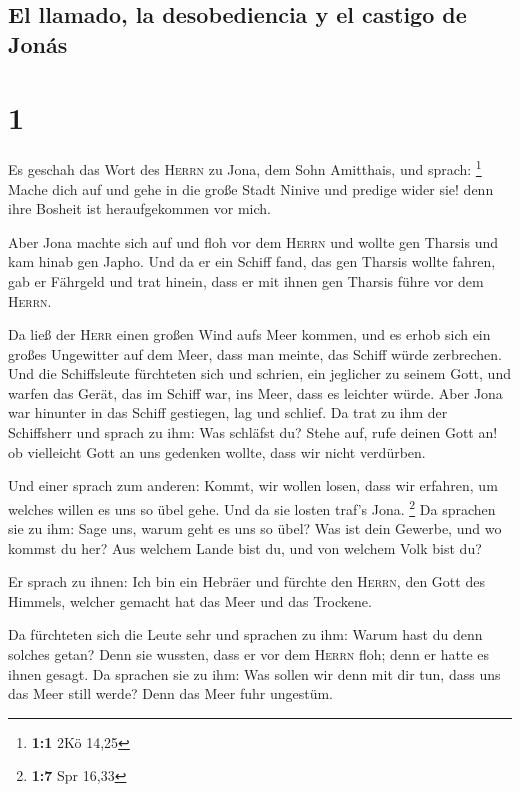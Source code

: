 \hypertarget{el-llamado-la-desobediencia-y-el-castigo-de-jonuxe1s}{%
\subsection{El llamado, la desobediencia y el castigo de
Jonás}\label{el-llamado-la-desobediencia-y-el-castigo-de-jonuxe1s}}

\hypertarget{section}{%
\section{1}\label{section}}

 Es geschah das Wort des \textsc{Herrn} zu Jona, dem Sohn
Amitthais, und sprach: \footnote{\textbf{1:1} 2Kö 14,25} 
Mache dich auf und gehe in die große Stadt Ninive und predige wider sie!
denn ihre Bosheit ist heraufgekommen vor mich.

 Aber Jona machte sich auf und floh vor dem \textsc{Herrn}
und wollte gen Tharsis und kam hinab gen Japho. Und da er ein Schiff
fand, das gen Tharsis wollte fahren, gab er Fährgeld und trat hinein,
dass er mit ihnen gen Tharsis führe vor dem \textsc{Herrn}.

 Da ließ der \textsc{Herr} einen großen Wind aufs Meer
kommen, und es erhob sich ein großes Ungewitter auf dem Meer, dass man
meinte, das Schiff würde zerbrechen.  Und die Schiffsleute
fürchteten sich und schrien, ein jeglicher zu seinem Gott, und warfen
das Gerät, das im Schiff war, ins Meer, dass es leichter würde. Aber
Jona war hinunter in das Schiff gestiegen, lag und schlief.
 Da trat zu ihm der Schiffsherr und sprach zu ihm: Was
schläfst du? Stehe auf, rufe deinen Gott an! ob vielleicht Gott an uns
gedenken wollte, dass wir nicht verdürben.

 Und einer sprach zum anderen: Kommt, wir wollen losen,
dass wir erfahren, um welches willen es uns so übel gehe. Und da sie
losten traf's Jona. \footnote{\textbf{1:7} Spr 16,33}  Da
sprachen sie zu ihm: Sage uns, warum geht es uns so übel? Was ist dein
Gewerbe, und wo kommst du her? Aus welchem Lande bist du, und von
welchem Volk bist du?

 Er sprach zu ihnen: Ich bin ein Hebräer und fürchte den
\textsc{Herrn}, den Gott des Himmels, welcher gemacht hat das Meer und
das Trockene.

 Da fürchteten sich die Leute sehr und sprachen zu ihm:
Warum hast du denn solches getan? Denn sie wussten, dass er vor dem
\textsc{Herrn} floh; denn er hatte es ihnen gesagt.  Da
sprachen sie zu ihm: Was sollen wir denn mit dir tun, dass uns das Meer
still werde? Denn das Meer fuhr ungestüm.

